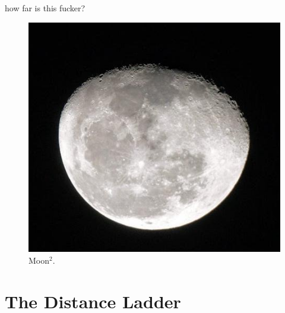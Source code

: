 \documentclass[12pt]{beamer}
\begin{document}
        \begin{frame}{how far is this fucker?}
            \begin{figure}
                \includegraphics[scale=0.45, fbox]{moon.jpg}
                \caption{Moon$^2$.}
            \end{figure}
        \end{frame}
\section{The Distance Ladder}
\end{document}
